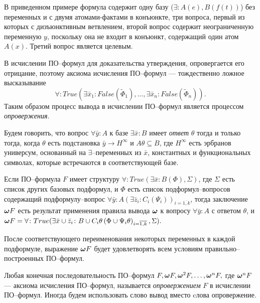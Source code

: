 \documentclass[a4paper]{report}
\begin{document}
В приведенном примере формула содержит одну базу ($\exists\colon A(e),B(f(t))$) без переменных и с двумя атомами-фактами в конъюнкте, три вопроса, первый из которых с дизъюнктивным ветвлением, второй вопрос содержит неограниченную переменную $y$, поскольку она не входит в конъюнкт, содержащий один атом $A(x)$. Третий вопрос является целевым. %

В исчислении ПО--формул для доказательства утверждения, опровергается его отрицание, поэтому аксиома исчисления ПО--формул ---  тождественно ложное высказывание $$\forall\colon True\left(\exists \bar{x}_1\colon False\left(\widetilde{\Phi}_1\right),\ldots,\exists \bar{x}_n\colon False\left(\widetilde{\Phi}_n\right)\right).$$ Таким образом процесс вывода в исчислении ПО--формул является процессом {\em опровержения}.

Будем говорить, что вопрос $\forall \bar{y}\colon A$ к базе $\exists \bar{x}\colon B$ имеет {\em ответ} $\theta$  тогда и только тогда, когда $\theta$ есть подстановка $\bar{y} \rightarrow H^{\infty}$ и $A\theta \subseteq B$, где $H^{\infty}$ есть эрбранов универсум, основанный на $\exists$--переменных из $\bar{x}$, константных и функциональных символах, которые встречаются в соответствующей базе.

Если ПО--формула $F$ имеет структуру $\forall\colon True\left(\exists \bar{x}\colon B\left(\Phi\right),\Sigma\right)$, где $\Sigma$ есть список других базовых подформул, и $\Phi$ есть список подформул--вопросов содержащий подформулу--вопрос $\forall \bar{y}\colon A(\exists \bar{z}_i\colon C_i\left(\Psi_i\right))_{i=\overline{1,k}}$, тогда заключение $\boldsymbol{\omega} F$ есть результат применения правила вывода $\boldsymbol{\omega}$ к вопросу $\forall \bar{y}\colon A$ с ответом $\theta$, и $\boldsymbol{\omega} F = \forall\colon True(\exists \bar{x} \cup \bar{z}_i\colon B \cup C_i\theta\left(\Phi \cup \Psi_i\theta\right)_{i=\overline{1,k}},\Sigma).$

После соответствующего переименования некоторых переменных в каждой подформуле, выражение $\boldsymbol{\omega} F$ будет удовлетворять всем условиям правильно--построенных ПО--формул.

Любая конечная последовательность ПО--формул $F, \boldsymbol{\omega} F, \boldsymbol{\omega}^2 F,\ldots,\boldsymbol{\omega}^n F,$ где $\boldsymbol{\omega}^n F$ --- аксиома исчисления ПО--формул, называется {\em опровержением} $F$ в исчислении ПО--формул. Иногда будем использовать слово вывод вместо cлова опровержение.
\end{document}
